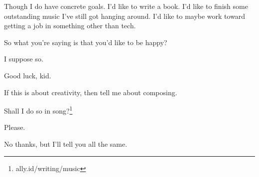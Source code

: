 \begin{paracol}{2}
\begin{leftcolumn}
Though I do have concrete goals. I'd like to write a book. I'd like to finish some outstanding music I've still got hanging around. I'd like to maybe work toward getting a job in something other than tech.

\begin{ally}
So what you're saying is that you'd like to be happy?
\end{ally}
I suppose so.

\begin{ally}
Good luck, kid.
\end{ally}
\newpage

\begin{ally}
If this is about creativity, then tell me about composing.
\end{ally}
Shall I do so in song?\footnote{ally.id/writing/music}

\begin{ally}
Please.
\end{ally}
No thanks, but I'll tell you all the same.
\newpage
\end{leftcolumn}
\end{paracol}
